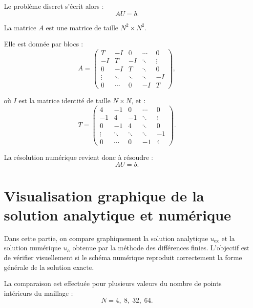 \documentclass[12pt,a4paper]{article}
\begin{document}
	Le problème discret s'écrit alors :
	\begin{equation*}
	\boxed{
		AU=b.
	}
	\end{equation*}
	
	La matrice \(A\) est une matrice de taille \(N^2\times N^2\).
	
	Elle est donnée par blocs :
	\begin{equation*}
	A=
	\begin{pmatrix}
	T & -I & 0 & \cdots & 0\\
	-I & T & -I & \ddots & \vdots\\
	0 & -I & T & \ddots & 0\\
	\vdots & \ddots & \ddots & \ddots & -I\\
	0 & \cdots & 0 & -I & T
	\end{pmatrix},
	\end{equation*}
	
	où \(I\) est la matrice identité de taille \(N\times N\), et :
	\begin{equation*}
	T=
	\begin{pmatrix}
	4 & -1 & 0 & \cdots & 0\\
	-1 & 4 & -1 & \ddots & \vdots\\
	0 & -1 & 4 & \ddots & 0\\
	\vdots & \ddots & \ddots & \ddots & -1\\
	0 & \cdots & 0 & -1 & 4
	\end{pmatrix}.
	\end{equation*}
	
	
La résolution numérique revient donc à résoudre :
\begin{equation*}
\boxed{
	AU=b.
}
\end{equation*}






\section{Visualisation graphique de la solution analytique et numérique}

Dans cette partie, on compare graphiquement la solution analytique $u_{\mathrm{ex}}$
et la solution numérique $u_h$ obtenue par la méthode des différences finies.
L'objectif est de vérifier visuellement si le schéma numérique reproduit
correctement la forme générale de la solution exacte.

La comparaison est effectuée pour plusieurs valeurs du nombre de points
intérieurs du maillage :
\[
N = 4,\; 8,\; 32,\; 64.
\]
\end{document}
